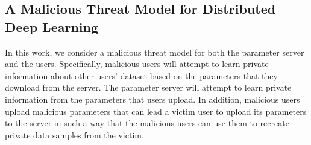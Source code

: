\documentclass[conference]{IEEEtran}
\begin{document}










\subsection{A Malicious Threat Model for Distributed Deep Learning}\label{sec:threatModel}


In this work, we consider a malicious threat model for both the parameter server and the users. Specifically, malicious users will
attempt to learn private information about other users' dataset based on the parameters that they download from the server. The
parameter server will attempt to learn private information from the parameters that users upload.  In
addition, malicious users upload malicious parameters that can lead a victim user to upload its parameters to the server in such a way
that the malicious users can use them to recreate private data samples from the victim.

  
\end{document}
